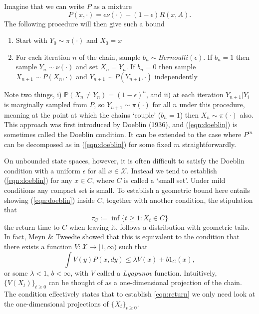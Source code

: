 \documentclass{article}
\newcommand{\ch}[1]{ \{#1_t\}_{t \geq 0} }
\newcommand{\X}{\mathcal{X}}
\begin{document}
Imagine that we can write $P$ as a mixture
\begin{equation} \label{eqn:doeblin}
P(x,\cdot) = \epsilon \nu(\cdot) + (1 - \epsilon)R(x,A).
\end{equation}
The following procedure will then give such a bound
\begin{enumerate}
\item Start with $Y_0 \sim \pi(\cdot)$ and $X_0 = x$
\item For each iteration $n$ of the chain, sample $b_n \sim Bernoulli(\epsilon)$.  If $b_n = 1$ then sample $Y_n \sim \nu(\cdot)$ and set $X_n = Y_n$.  If $b_n = 0$ then sample $X_{n+1} \sim P(X_n,\cdot)$ and $Y_{n+1} \sim P(Y_{n+1},\cdot)$ independently
\end{enumerate}
Note two things, i) $\mathbb{P}(X_n \neq Y_n) = (1-\epsilon)^n$, and ii) at each iteration $Y_{n+1}|Y_i$ is marginally sampled from $P$, so $Y_{n+1} \sim \pi(\cdot)$ for all $n$ under this procedure, meaning at the point at which the chains `couple' ($b_n = 1$) then $X_n \sim \pi(\cdot)$ also.  This approach was first introduced by Doeblin (1936), and (\ref{eqn:doeblin}) is sometimes called the Doeblin condition.  It can be extended to the case where $P^m$ can be decomposed as in (\ref{eqn:doeblin}) for some fixed $m$ straightforwardly.

On unbounded state spaces, however, it is often difficult to satisfy the Doeblin condition with a uniform $\epsilon$ for all $x \in \X$.  Instead we tend to establish (\ref{eqn:doeblin}) for any $x \in C$, where $C$ is called a `small set'.  Under mild conditions any compact set is small.  To establish a geometric bound here entails showing (\ref{eqn:doeblin}) inside $C$, together with another condition, the stipulation that
\begin{equation} \label{eqn:return}
\tau_C := \inf \{ t \geq 1 : X_t \in C \}
\end{equation}
the return time to $C$ when leaving it, follows a distribution with geometric tails.  In fact, Meyn \& Tweedie showed that this is equivalent to the condition that there exists a function $V: \X \to [1,\infty)$ such that
\begin{equation}
\int V(y)P(x,dy) \leq \lambda V(x) + b1_C(x),
\end{equation}
or some $\lambda<1$, $b < \infty$, with $V$ called a \emph{Lyapunov} function.  Intuitively, $\{ V(X_t) \}_{t \geq 0}$ can be thought of as a one-dimensional projection of the chain.  The condition effectively states that to establish \ref{eqn:return} we only need look at the one-dimensional projections of $\ch{X}$.
\end{document}
